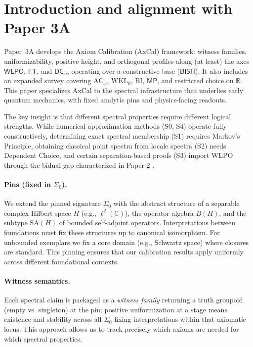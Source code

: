 \documentclass[11pt]{article}
\newcommand{\WLPO}{\mathsf{WLPO}}
\newcommand{\FT}{\mathsf{FT}}
\newcommand{\DCw}{\mathsf{DC}_{\omega}}
\newcommand{\MP}{\mathsf{MP}}
\theoremstyle{plain}
\theoremstyle{definition}
\theoremstyle{remark}
\newcommand{\R}{\mathbb{R}}
\newcommand{\C}{\mathbb{C}}
\newcommand{\BISH}{\mathsf{BISH}}
\newcommand{\ACw}{\mathrm{AC}_\omega}
\newcommand{\WKLz}{\mathrm{WKL}_0}
\newcommand{\BI}{\mathrm{BI}}
\newcommand{\SigmaZero}{\Sigma_{0}}
\begin{document}
\section{Introduction and alignment with Paper 3A}

Paper~3A \cite{Paper3A} develops the Axiom Calibration (AxCal) framework: witness families, uniformizability, positive height, and orthogonal profiles
along (at least) the axes $\WLPO$, $\FT$, and $\DCw$, operating over a constructive base ($\BISH$). It also includes an expanded survey covering $\ACw$, $\WKLz$, $\BI$, $\MP$, and restricted choice on $\R$.
This paper specializes AxCal to the spectral infrastructure that underlies early quantum mechanics,
with fixed analytic pins and physics-facing readouts.

The key insight is that different spectral properties require different logical strengths. While numerical approximation methods (S0, S4) operate fully constructively, 
determining exact spectral membership (S1) requires Markov's Principle, obtaining classical point spectra from locale spectra (S2) needs Dependent Choice, 
and certain separation-based proofs (S3) import WLPO through the bidual gap characterized in Paper 2 \cite{Paper2}.

\paragraph{Pins (fixed in $\SigmaZero$).}
We extend the pinned signature $\SigmaZero$ with the abstract structure of a separable complex Hilbert space $H$ (e.g., $\ell^2(\C)$), the operator algebra $B(H)$,
and the subtype $\mathrm{SA}(H)$ of bounded self-adjoint operators. Interpretations between foundations must fix these structures up to canonical isomorphism. For unbounded exemplars we fix a
core domain (e.g., Schwartz space) where closures are standard. This pinning ensures that our calibration results apply uniformly across different foundational contexts.

\paragraph{Witness semantics.}
Each spectral claim is packaged as a \emph{witness family} returning a truth groupoid (empty vs. singleton)
at the pin; positive uniformization at a stage means existence and stability across all $\SigmaZero$-fixing interpretations within that axiomatic locus.
This approach allows us to track precisely which axioms are needed for which spectral properties.
\end{document}

